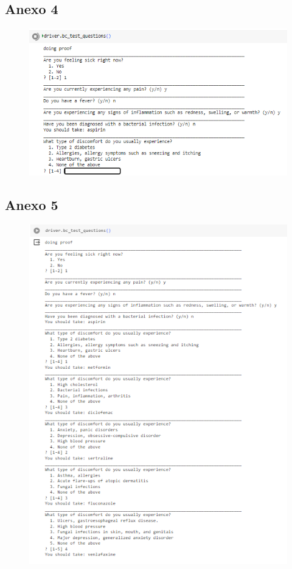 \documentclass[11pt]{article}
\begin{document}
\subsection{Anexo 4}
\begin{figure}[H]
  \centering
  \includegraphics[width=\linewidth]{Graphs/imagen3.png}
  \label{fig:imagen3}
\end{figure}

\subsection{Anexo 5}
\begin{figure}[H]
  \centering
  \includegraphics[width=\linewidth]{Graphs/imagen4.png}
  \label{fig:imagen4}
\end{figure}
\end{document}
